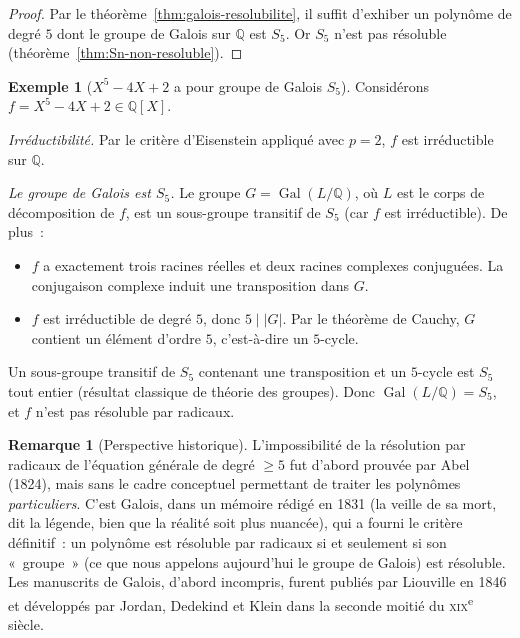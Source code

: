\documentclass[12pt,a4paper,openany]{book}
\theoremstyle{definition}
\newtheorem{remarque}{Remarque}[chapter]
\newtheorem{exemple}{Exemple}[chapter]
\newcommand{\Q}{\mathbb{Q}}
\newcommand{\Gal}{\operatorname{Gal}}
\begin{document}
\begin{proof}
Par le théorème~\ref{thm:galois-resolubilite}, il suffit d'exhiber un
polynôme de degré $5$ dont le groupe de Galois sur $\Q$ est $S_5$. Or $S_5$
n'est pas résoluble (théorème~\ref{thm:Sn-non-resoluble}).
\end{proof}

\begin{exemple}[$X^5 - 4X + 2$ a pour groupe de Galois $S_5$]\label{ex:X5-4X+2}
Considérons $f = X^5 - 4X + 2 \in \Q[X]$.

\emph{Irréductibilité.} Par le critère d'Eisenstein appliqué avec $p = 2$,
$f$ est irréductible sur $\Q$.

\emph{Le groupe de Galois est $S_5$.} Le groupe $G = \Gal(L/\Q)$, où $L$ est
le corps de décomposition de $f$, est un sous-groupe transitif de $S_5$ (car
$f$ est irréductible). De plus~:
\begin{itemize}
  \item $f$ a exactement trois racines réelles et deux racines complexes
    conjuguées. La conjugaison complexe induit une transposition dans $G$.
  \item $f$ est irréductible de degré $5$, donc $5 \mid |G|$. Par le théorème
    de Cauchy, $G$ contient un élément d'ordre $5$, c'est-à-dire un $5$-cycle.
\end{itemize}
Un sous-groupe transitif de $S_5$ contenant une transposition et un
$5$-cycle est $S_5$ tout entier (résultat classique de théorie des groupes).
Donc $\Gal(L/\Q) = S_5$, et $f$ n'est pas résoluble par radicaux.
\end{exemple}

\begin{remarque}[Perspective historique]\label{rem:perspective-historique}
L'impossibilité de la résolution par radicaux de l'équation générale de degré
$\geq 5$ fut d'abord prouvée par Abel (1824), mais sans le cadre conceptuel
permettant de traiter les polynômes \emph{particuliers}. C'est Galois, dans
un mémoire rédigé en 1831 (la veille de sa mort, dit la légende, bien que la
réalité soit plus nuancée), qui a fourni le critère définitif~: un polynôme
est résoluble par radicaux si et seulement si son «~groupe~» (ce que nous
appelons aujourd'hui le groupe de Galois) est résoluble. Les manuscrits de
Galois, d'abord incompris, furent publiés par Liouville en 1846 et
développés par Jordan, Dedekind et Klein dans la seconde moitié du
\textsc{xix}\textsuperscript{e} siècle.
\end{remarque}
\end{document}
